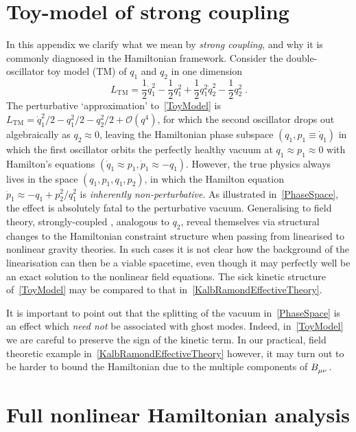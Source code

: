 \documentclass[aps,prd,reprint,preprintnumbers,showpacs,floatfix,nofootinbib,superscript address,longbibliography]{revtex4-1}
\begin{document}
\section{Toy-model of strong coupling}\label{SCIntro}


\vspace{10pt}

In this appendix we clarify what we mean by \emph{strong coupling}, and why it is commonly diagnosed in the Hamiltonian framework. Consider the double-oscillator toy model (TM) of \dof $q_1$ and $q_2$ in one dimension
\begin{equation}\label{ToyModel}
	L_{\text{TM}}=\frac{1}{2}\dot{q}_1^2-\frac{1}{2}q_1^2+\frac{1}{2}q_1^2\dot{q}_2^2-\frac{1}{2}q_2^2 \;.
\end{equation}
The perturbative `approximation' to~\cref{ToyModel} is $L_{\text{TM}}=\dot{q}_1^2/2-q_1^2/2-q_2^2/2+\mathcal{O}\left(q^4\right)$, for which the second oscillator drops out algebraically as $q_2\approx 0$, leaving the Hamiltonian phase subspace $\left(q_1,p_1\equiv\dot{q}_1\right)$ in which the first oscillator orbits the perfectly healthy vacuum at $q_1\approx p_1\approx 0$ with Hamilton's equations $\left(\dot{q}_1\approx p_1,\dot{p}_1\approx-q_1\right)$. However, the true physics always lives in the space $\left(q_1,p_1,q_1,p_2\right)$, in which the Hamilton equation $\dot{p}_1\approx -q_1+p_2^2/q_1^2$ is \emph{inherently non-perturbative}. As illustrated in~\cref{PhaseSpace}, the effect is absolutely fatal to the perturbative vacuum. Generalising to field theory, strongly-coupled \dof, analogous to $q_2$, reveal themselves via structural changes to the Hamiltonian constraint structure when passing from linearised to nonlinear gravity theories. In such cases it is not clear how the background of the linearisation can then be a viable spacetime, even though it may perfectly well be an exact solution to the nonlinear field equations. The sick kinetic structure of~\eqref{ToyModel} may be compared to that in~\eqref{KalbRamondEffectiveTheory}.

It is important to point out that the splitting of the vacuum in~\cref{PhaseSpace} is an effect which \emph{need not} be associated with ghost modes. Indeed, in~\cref{ToyModel} we are careful to preserve the sign of the kinetic term. In our practical, field theoretic example in~\cref{KalbRamondEffectiveTheory} however, it may turn out to be harder to bound the Hamiltonian due to the multiple components of $\B{_{\mu\nu}}$. 

\section{Full nonlinear Hamiltonian analysis}\label{FullAnalysis}
\end{document}
